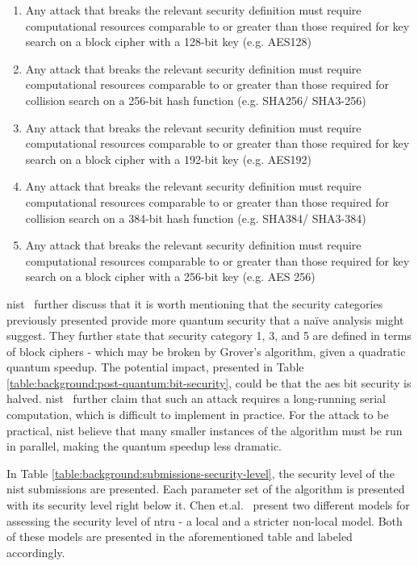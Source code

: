 \begin{enumerate}
    \item Any attack that breaks the relevant security definition must require computational resources comparable to or greater than those required for key search on a block cipher with a 128-bit key (e.g. AES128)
    \item Any attack that breaks the relevant security definition must require computational resources comparable to or greater than those required for collision search on a 256-bit hash function (e.g. SHA256/ SHA3-256)
    \item Any attack that breaks the relevant security definition must require computational resources comparable to or greater than those required for key search on a block cipher with a 192-bit key (e.g. AES192)
    \item Any attack that breaks the relevant security definition must require computational resources comparable to or greater than those required for collision search on a 384-bit hash function (e.g. SHA384/ SHA3-384)
    \item Any attack that breaks the relevant security definition must require computational resources comparable to or greater than those required for key search on a block cipher with a 256-bit key (e.g. AES 256)
\end{enumerate}

\gls{nist}~\cite{nist2017} further discuss that it is worth mentioning that the security categories previously presented provide more quantum security that a naïve analysis might suggest. They further state that security category 1, 3, and 5 are defined in terms of block ciphers - which may be broken by Grover's algorithm, given a quadratic quantum speedup. The potential impact, presented in Table \ref{table:background:post-quantum:bit-security}, could be that the \gls{aes} bit security is halved. \gls{nist}~\cite{nist2017} further claim that such an attack requires a long-running serial computation, which is difficult to implement in practice. For the attack to be practical, \gls{nist} believe that many smaller instances of the algorithm must be run in parallel, making the quantum speedup less dramatic.

In Table \ref{table:background:submissions-security-level}, the security level of the \gls{nist} submissions are presented. Each parameter set of the algorithm is presented with its security level right below it. Chen et.al.~\cite{ntru2020} present two different models for assessing the security level of \gls{ntru} - a local and a stricter non-local model. Both of these models are presented in the aforementioned table and labeled accordingly.

